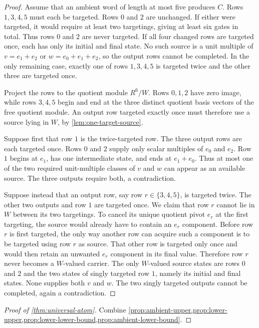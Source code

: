 \begin{proof}
Assume that an ambient word of length at most five produces $C$.  Rows $1,3,4,5$ must each be targeted.  Rows $0$ and $2$ are unchanged.  If either were targeted, it would require at least two targetings, giving at least six gates in total.  Thus rows $0$ and $2$ are never targeted.  If all four changed rows are targeted once, each has only its initial and final state.  No such source is a unit multiple of $v=e_1+e_2$ or $w=e_0+e_1+e_2$, so the output rows cannot be completed.  In the only remaining case, exactly one of rows $1,3,4,5$ is targeted twice and the other three are targeted once.

Project the rows to the quotient module $R^6/W$.  Rows $0,1,2$ have zero image, while rows $3,4,5$ begin and end at the three distinct quotient basis vectors of the free quotient module.  An output row targeted exactly once must therefore use a source lying in $W$, by \cref{lem:one-target-source}.

Suppose first that row $1$ is the twice-targeted row.  The three output rows are each targeted once.  Rows $0$ and $2$ supply only scalar multiples of $e_0$ and $e_2$.  Row $1$ begins at $e_1$, has one intermediate state, and ends at $e_1+e_0$.  Thus at most one of the two required unit-multiple classes of $v$ and $w$ can appear as an available source.  The three outputs require both, a contradiction.

Suppose instead that an output row, say row $r\in\{3,4,5\}$, is targeted twice.  The other two outputs and row $1$ are targeted once.  We claim that row $r$ cannot lie in $W$ between its two targetings.  To cancel its unique quotient pivot $e_r$ at the first targeting, the source would already have to contain an $e_r$ component.  Before row $r$ is first targeted, the only way another row can acquire such a component is to be targeted using row $r$ as source.  That other row is targeted only once and would then retain an unwanted $e_r$ component in its final value.  Therefore row $r$ never becomes a $W$-valued carrier.  The only $W$-valued source states are rows $0$ and $2$ and the two states of singly targeted row $1$, namely its initial and final states.  None supplies both $v$ and $w$.  The two singly targeted outputs cannot be completed, again a contradiction.
\end{proof}

\begin{proof}[Proof of \cref{thm:universal-atom}]
Combine \cref{prop:ambient-upper,prop:lower-upper,prop:lower-lower-bound,prop:ambient-lower-bound}.
\end{proof}

